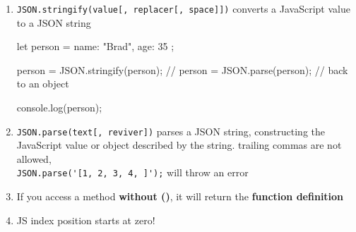 \documentclass[a4paper,12pt]{article}
\begin{document}
\begin{enumerate}
\item \verb|JSON.stringify(value[, replacer[, space]])| converts a JavaScript value to a JSON string
\begin{jscode}
let person = {
  name: "Brad",
  age: 35
};

person = JSON.stringify(person);
// person = JSON.parse(person);  // back to an object

console.log(person);
\end{jscode}

\item \verb|JSON.parse(text[, reviver])| parses a JSON string, constructing the JavaScript value or object described by the string. trailing commas are not allowed,\\ \verb|JSON.parse('[1, 2, 3, 4, ]');| will throw an error

\item If you access a method \textbf{without ()}, it will return the \textbf{function definition}

\item JS index position starts at zero!
\end{enumerate}
\end{document}
